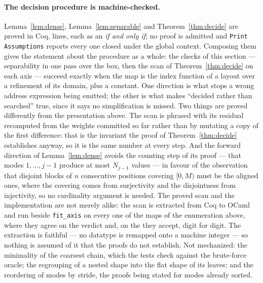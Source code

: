 \documentclass[11pt]{article}
\theoremstyle{definition}
\begin{document}
\paragraph{The decision procedure is machine-checked.} Lemma~\ref{lem:dense},
Lemma~\ref{lem:separable} and Theorem~\ref{thm:decide} are proved in Coq,
\evalCoqLines{} lines, each as an \emph{if and only if}; no proof is admitted
and \texttt{Print Assumptions} reports every one closed under the global
context. Composing them gives the statement about the procedure as a whole:
the checks of this section --- separability in one pass over the box, then the
scan of Theorem~\ref{thm:decide} on each axis --- succeed exactly when the map
is the index function of a layout over a refinement of its domain, plus a
constant. One direction is what stops a wrong address expression being
emitted; the other is what makes ``decided rather than searched'' true, since
it says no simplification is missed. Two things are proved
differently from the presentation above. The scan is phrased with its residual
recomputed from the weights committed so far rather than by mutating a copy of
the first difference: that is the invariant the proof of
Theorem~\ref{thm:decide} establishes anyway, so it is the same number at every
step. And the forward direction of Lemma~\ref{lem:dense} avoids the counting
step of its proof --- that modes $1,\dots,j{-}1$ produce at most $N_{j-1}$
values --- in favour of the observation that disjoint blocks of $n$ consecutive
positions covering $[0,M)$ must be the aligned ones, where the covering comes
from surjectivity and the disjointness from injectivity, so no cardinality
argument is needed. The proved scan and the implementation are not merely
alike: the scan is extracted from Coq to OCaml and run beside
\texttt{fit\_axis} on every one of the \evalExtractedMaps{} maps of the
enumeration above, where they agree on the verdict and, on the
\evalExtractedStrided{} they accept, digit for digit. The extraction is
faithful --- no datatype is remapped onto a machine integer --- so nothing is
assumed of it that the proofs do not establish. Not mechanized: the minimality of the
coarsest chain, which the tests check against the brute-force oracle; the
regrouping of a nested shape into the flat shape of its leaves; and the
reordering of modes by stride, the proofs being stated for modes already
sorted.
\end{document}
